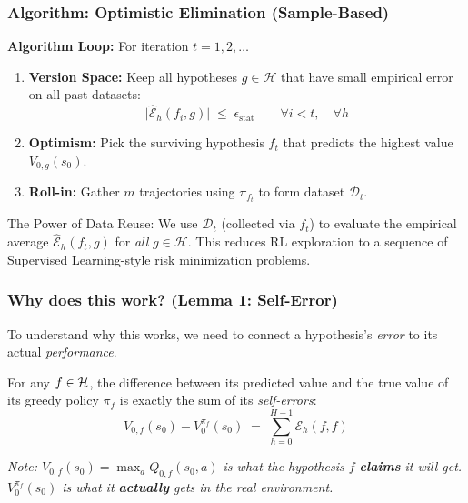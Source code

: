 \documentclass[aspectratio=169]{beamer}
\begin{document}
\begin{frame}\frametitle{Algorithm: Optimistic Elimination (Sample-Based)}

\textbf{Algorithm Loop:} For iteration $t = 1, 2, \dots$
\begin{enumerate}
    \item \textbf{Version Space:} Keep all hypotheses $g \in \mathcal{H}$ that have small empirical error on all past datasets:
    \[
      \big|\widehat{\mathcal{E}}_h(f_i, g)\big| \;\le\; \epsilon_{\text{stat}} \qquad \forall i < t, \quad \forall h
    \]
    \item \textbf{Optimism:} Pick the surviving hypothesis $f_t$ that predicts the highest value $V_{0, g}(s_0)$.
    \item \textbf{Roll-in:} Gather $m$ trajectories using $\pi_{f_t}$ to form dataset $\mathcal{D}_t$.
\end{enumerate}

\pause
\vspace{0.4cm}
\alert{The Power of Data Reuse:} 
We use $\mathcal{D}_t$ (collected via $f_t$) to evaluate the empirical average $\widehat{\mathcal{E}}_h(f_t, g)$ for \emph{all} $g \in \mathcal{H}$. This reduces RL exploration to a sequence of Supervised Learning-style risk minimization problems.
\end{frame}

\begin{frame}\frametitle{Why does this work? (Lemma 1: Self-Error)}

To understand why this works, we need to connect a hypothesis's \emph{error} to its actual \emph{performance}.

\vspace{0.4cm}
\begin{lemma}
For any $f \in \mathcal{H}$, the difference between its predicted value and the true value of its greedy policy $\pi_f$ is exactly the sum of its \emph{self-errors}:
\[
V_{0,f}(s_0) - V_0^{\pi_f}(s_0) \;=\; \sum_{h=0}^{H-1} \mathcal{E}_h(f,f)
\]
\end{lemma}

\vspace{0.4cm}
\pause
\textit{Note: $V_{0,f}(s_0) = \max_a Q_{0,f}(s_0, a)$ is what the hypothesis $f$ \textbf{claims} it will get. $V_0^{\pi_f}(s_0)$ is what it \textbf{actually} gets in the real environment.}

\end{frame}
\end{document}
